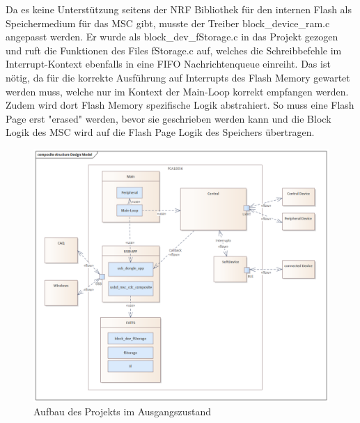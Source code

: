 Da es keine Unterstützung seitens der NRF Bibliothek für den internen Flash als Speichermedium für das \ac{MSC} gibt, musste der Treiber block\_device\_ram.c angepasst werden. Er wurde als block\_dev\_fStorage.c in das Projekt gezogen und ruft die Funktionen des Files fStorage.c auf, welches die Schreibbefehle im Interrupt-Kontext ebenfalls in eine \ac{FIFO} Nachrichtenqueue einreiht. Das ist nötig, da für die korrekte Ausführung auf Interrupts des Flash Memory gewartet werden muss, welche nur im Kontext der Main-Loop korrekt empfangen werden. Zudem wird dort Flash Memory spezifische Logik abstrahiert. So muss eine Flash Page erst "erased" werden, bevor sie geschrieben werden kann und die Block Logik des \ac{MSC} wird auf die Flash Page Logik des Speichers übertragen.

\begin{figure}[H] 
	\centering
	\includegraphics[width=\textwidth]{figures/Design_Model.png}
	\caption{Aufbau des Projekts im Ausgangszustand}
\end{figure}


